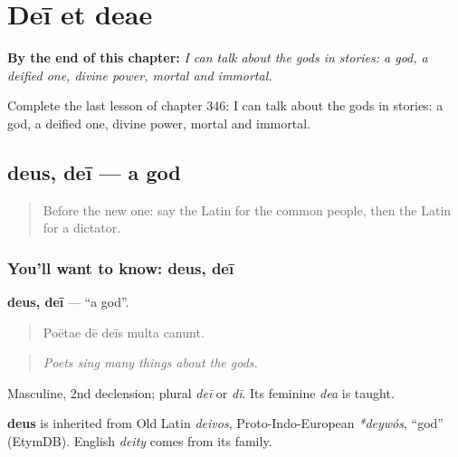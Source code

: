 
\chapter{Deī et deae}
\label{ch:la-dei-et-deae}

\begin{chapteropening}
\textbf{By the end of this chapter:} \emph{I can talk about the gods in stories: a god, a deified one, divine power, mortal and immortal.}

Complete the last lesson of chapter 346: I can talk about the gods in stories: a god, a deified one, divine power, mortal and immortal.
\end{chapteropening}

\section[deus, deī]{deus, deī — a god}

\label{lesson:LA-C346-deus}



\begin{quote}
Before the new one: say the Latin for the common people, then the Latin for a dictator.
\end{quote}

\subsection*{You'll want to know: deus, deī}
\textbf{deus, deī} — \textquotedblleft{}a god\textquotedblright{}.

\begin{quote}
Poētae dē deīs multa canunt.
\end{quote}

\begin{quote}
\emph{Poets sing many things about the gods.}
\end{quote}

Masculine, 2nd declension; plural \emph{deī} or \emph{dī}. Its feminine \emph{dea} is taught.

\begin{cousinweb}
\textbf{deus} is inherited from Old Latin \emph{deivos}, Proto-Indo-European \emph{*deywós}, \textquotedblleft{}god\textquotedblright{} (EtymDB). English \emph{deity} comes from its family.
\end{cousinweb}


